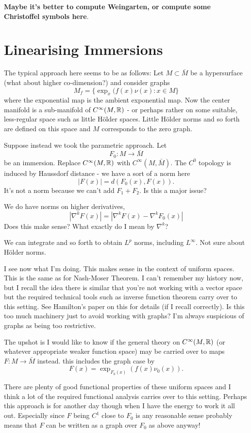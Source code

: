 \documentclass{amsart}
\begin{document}
\textbf{Maybe it's better to compute Weingarten, or compute some Christoffel symbols here}.

\section{Linearising Immersions}
\label{sec:linearising_immersions}

The typical approach here seems to be as follows: Let \(M \subset \bar{M}\) be a hypersurface (what about higher co-dimension?) and consider graphs
\[
M_f = \{\exp_x(f(x)\nu(x) : x \in M\}
\]
where the exponential map is the ambient exponential map. Now the center manifold is a sub-manifold of \(C^{\infty}(M, \mathbb{R})\) - or perhaps rather on some suitable, less-regular space such as little H\"older spaces. Little H\"older norms and so forth are defined on this space and \(M\) corresponds to the zero graph.

Suppose instead we took the parametric approach. Let
\[
F_0 : M \to \bar{M}
\]
be an immersion. Replace \(C^{\infty}(M, \mathbb{R})\) with \(C^{\infty} (M, \bar{M})\). The \(C^0\) topology is induced by Haussdorf distance - we have a sort of a norm here
\[
|F(x)| = d(F_0(x), F(x)).
\]
It's not a norm because we can't add $F_1 + F_2$. Is this a major issue?

We do have norms on higher derivatives,
\[
|\nabla^k F (x)| = |\nabla^k F(x) - \nabla^k F_0(x)|
\]
Does this make sense? What exactly do I mean by \(\nabla^k\)? 

We can integrate and so forth to obtain \(L^p\) norms, including \(L^{\infty}\). Not sure about H\"older norms. 

I see now what I'm doing. This makes sense in the context of uniform spaces. This is the same as for Nash-Moser Theorem. I can't remember my history now, but I recall the idea there is similar that you're not working with a vector space but the required technical tools such as inverse function theorem carry over to this setting. See Hamilton's paper on this for details (if I recall correctly). Is this too much machinery just to avoid working with graphs? I'm always suspicious of graphs as being too restrictive.

The upshot is I would like to know if the general theory on \(C^{\infty}(M, \mathbb{R})\) (or whatever appropriate weaker function space) may be carried over to maps \(F : M \to \bar{M}\) instead. this includes the graph case by
\[
F(x) = \exp_{F_0(x)} (f(x) \nu_0(x)).
\]

There are plenty of good functional properties of these uniform spaces and I think a lot of the required functional analysis carries over to this setting. Perhaps this approach is for another day though when I have the energy to work it all out. Especially since \(F\) being \(C^1\) close to \(F_0\) is any reasonable sense probably means that \(F\) can be written as a graph over \(F_0\) as above anyway!



\end{document}
